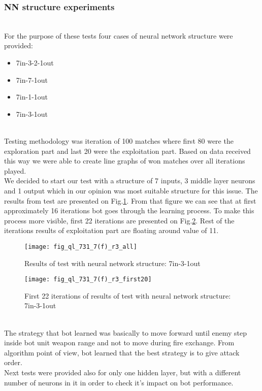 \subsubsection{NN structure experiments}\hfill \\ \hphantom{x}
For the purpose of these tests four cases of neural network structure were provided:
\begin{itemize}
\item 7in-3-2-1out
\item 7in-7-1out
\item 7in-1-1out
\item 7in-3-1out
\end{itemize}
\hfill \\ \hphantom{x}
Testing methodology was iteration of 100 matches where first 80 were the exploration part and last 20 were the exploitation part. Based on data received this way we were able to create line graphs of won matches over all iterations played.
\\ \hphantom{x}
We decided to start our test with a structure of 7 inputs, 3 middle layer neurons and 1 output which in our opinion was most suitable structure for this issue. The results from test are presented on Fig.\ref{fig:nnfr}. From that figure we can see that at first approximately 16 iterations bot goes through the learning process. To make this process more visible, first 22 iterations are presented on Fig.\ref{fig:nnff}. Rest of the iterations results of exploitation part are floating around value of 11.
\hfill \\ \hphantom{x}
\begin{figure}[htp]
\centerline{\texttt{[image: fig\_ql\_731\_7(f)\_r3\_all]}}
\caption{Results of test with neural network structure: 7in-3-1out}
\label{fig:nnfr}
\end{figure}
\begin{figure}[htp]
\centerline{\texttt{[image: fig\_ql\_731\_7(f)\_r3\_first20]}}
\caption{First 22 iterations of results of test with neural network structure: 7in-3-1out}
\label{fig:nnff}
\end{figure}
\hfill \\ \hphantom{x}
The strategy that bot learned was basically to move forward until enemy step inside bot unit weapon range and not to move during fire exchange. From algorithm point of view, bot learned that the best strategy is to give attack order.
\\ \hphantom{x}
Next tests were provided also for only one hidden layer, but with a different number of neurons in it in order to check it's impact on bot performance.
